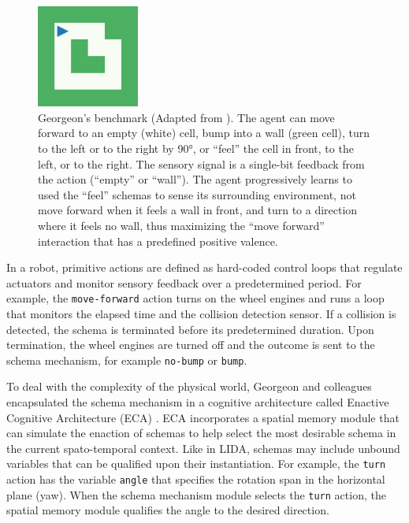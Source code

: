 \documentclass[runningheads]{llncs}
\begin{document}
\begin{figure}
	\centering
	\includegraphics[width=0.3\textwidth]{Figure_grid_plot.pdf}
	\caption{Georgeon's benchmark (Adapted from \cite{georgeon_intrinsically-motivated_2012}).
		The agent can move forward to an empty (white) cell, bump into a wall (green cell), turn to the left or to the right by 90°, or ``feel'' the cell in front, to the left, or to the right. 
		The sensory signal is a single-bit feedback from the action (``empty'' or ``wall''). 	
		The agent progressively learns to used the ``feel'' schemas to sense its surrounding environment, not move forward when it feels a wall in front, and turn to a direction where it feels no wall, thus maximizing the ``move forward'' interaction that has a predefined positive valence.
	} 
	\label{fig:georgeon}
\end{figure}

In a robot, primitive actions are defined as hard-coded control loops that regulate actuators and monitor sensory feedback over a predetermined period. 
For example, the \texttt{move-forward} action turns on the wheel engines and runs a loop that monitors the elapsed time and the collision detection sensor. 
If a collision is detected, the schema is terminated before its predetermined duration. 
Upon termination, the wheel engines are turned off and the outcome is sent to the schema mechanism, for example \texttt{no-bump} or \texttt{bump}.

To deal with the complexity of the physical world, Georgeon and colleagues encapsulated the schema mechanism in a cognitive architecture called Enactive Cognitive Architecture (ECA) \cite{georgeon_eca_2013}.
ECA incorporates a spatial memory module that can simulate the enaction of schemas to help select the most desirable schema in the current spato-temporal context. 
Like in LIDA, schemas may include unbound variables that can be qualified upon their instantiation. 
For example, the \texttt{turn} action has the variable \texttt{angle} that specifies the rotation span in the horizontal plane (yaw).
When the schema mechanism module selects the \texttt{turn} action, the spatial memory module qualifies the angle to the desired direction.
\end{document}
